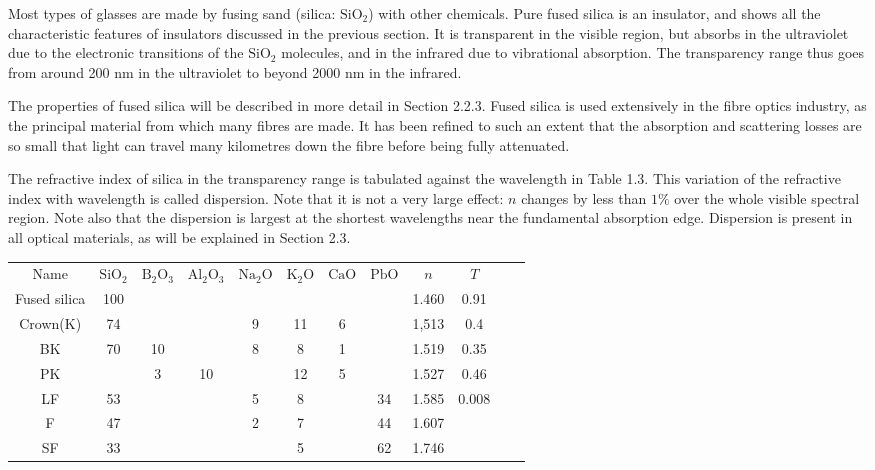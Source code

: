 \documentclass[12pt]{book}
\begin{document}
Most types of glasses are made by fusing sand (silica: $\mathrm{SiO_2}$) with other chemicals. Pure fused silica is an insulator, and shows all the characteristic features of insulators discussed in the previous section. It is transparent in the visible region, but absorbs in the ultraviolet due to the electronic transitions of the $\mathrm{SiO_2}$ molecules, and in the infrared due to vibrational absorption. The transparency range thus goes from around 200 nm in the ultraviolet to beyond 2000 nm in the infrared.

The properties of fused silica will be described in more detail in Section 2.2.3. Fused silica is used extensively in the fibre optics industry, as the principal material from which many fibres are made. It has been refined to such an extent that the absorption and scattering losses are so small that light can travel many kilometres down the fibre before being fully attenuated.

The refractive index of silica in the transparency range is tabulated against the wavelength in Table 1.3. This variation of the refractive index with wavelength is called dispersion. Note that it is not a very large effect: $n$ changes by less than $1\%$ over the whole visible spectral region. Note also that the dispersion is largest at the shortest wavelengths near the fundamental absorption edge. Dispersion is present in all optical materials, as will be explained in Section 2.3.

\begin{table}[htbp]\footnotesize
\begin{tabular}{cccccccccccc}

Name & $\mathrm{SiO_2}$&$\mathrm{B_2O_3}$&$\mathrm{Al_2O_3}$&$\mathrm{Na_2O}$&$\mathrm{K_2O}$&$\mathrm{CaO}$&$\mathrm{PbO}$&$n$&$T$\\

Fused silica &100&&&&&&&1.460 &0.91\\
Crown(K)&74&&&9&11&6&&1,513&0.4\\
BK&70&10&&8&8&1&&1.519&0.35\\
PK&&3&10&&12&5&&1.527&0.46\\
LF&53&&&5&8&&34&1.585&0.008\\
F&47&&&2&7&&44&1.607&\\
SF&33&&&&5&&62&1.746&\\

\end{tabular}
\label{tab:1.1}
\end{table}%
\end{document}
